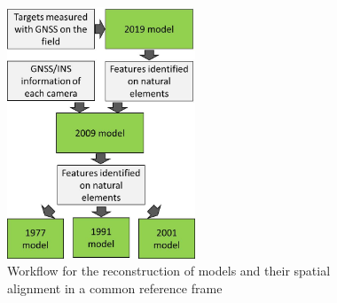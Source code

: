 \begin{figure}
    \centering
    \includegraphics[width=0.5\textwidth]{workflow}
    \caption{Workflow for the reconstruction of models and their spatial alignment in a common reference frame}
    \label{fig:2:workflow}
\end{figure}

